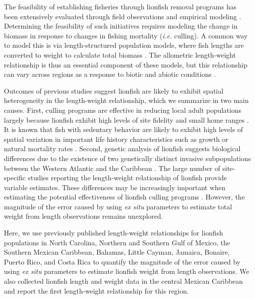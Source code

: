 \documentclass[fleqn,10pt,lineno]{wlpeerj} %
\begin{document}
The feasibility of establishing fisheries through lionfish removal
programs has been extensively evaluated through field observations and
empirical modeling
\citep{barbour_2011,morris_2011,deleon_2013,johnston_2015,sandel_2015,usseglio_2017}.
Determining the feasibility of such initiatives requires modeling the
change in biomass in response to changes in fishing mortality
(\emph{i.e.} culling). A common way to model this is via
length-structured population models, where fish lengths are converted to
weight to calculate total biomass
\citep{barbour_2011,cote_2014,andradibrown_2017}. The allometric
length-weight relationship is thus an essential component of these
models, but this relationship can vary across regions as a response to
biotic and abiotic conditions \citep{johnson_2016}.

Outcomes of previous studies suggest lionfish are likely to exhibit
spatial heterogeneity in the length-weight relationship, which we
summarize in two main causes. First, culling programs are effective in
reducing local adult populations largely because lionfish exhibit high
levels of site fidelity and small home ranges
\citep{Fishelson_1997,kochzius_2005,jud_2012,cote_2014}. It is known
that fish with sedentary behavior are likely to exhibit high levels of
spatial variation in important life history characteristics such as
growth or natural mortality rates
\citep{gunderson_2008,hutchinson_2008,wilson_2012,guan_2013}. Second,
genetic analysis of lionfish suggests biological differences due to the
existence of two genetically distinct invasive subpopulations between
the Western Atlantic and the Caribbean \citep{betancurr_2011}. The large
number of site-specific studies reporting the length-weight relationship
of lionfish provide variable estimates. These differences may be
increasingly important when estimating the potential effectiveness of
lionfish culling programs
\citep{barbour_2011,morris_2011,cote_2014,johnston_2015}. However, the
magnitude of the error caused by using \emph{ex situ} parameters to
estimate total weight from length observations remains unexplored.

Here, we use previously published length-weight relationships for
lionfish populations in North Carolina, Northern and Southern Gulf of
Mexico, the Southern Mexican Caribbean, Bahamas, Little Cayman, Jamaica,
Bonaire, Puerto Rico, and Costa Rica to quantify the magnitude of the
error caused by using \emph{ex situ} parameters to estimate lionfish
weight from length observations. We also collected lionfish length and
weight data in the central Mexican Caribbean and report the first
length-weight relationship for this region.
\end{document}
